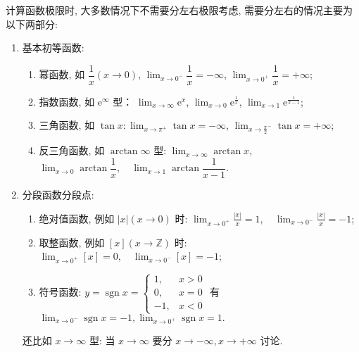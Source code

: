 计算函数极限时, 大多数情况下不需要分左右极限考虑, 需要分左右的情况主要为以下两部分:
\begin{enumerate}[label=(\arabic{*})]
    \item 基本初等函数:
    \begin{enumerate}
        \item 幂函数, 如 $ \dfrac{1}{x}(x \to 0) $, $\displaystyle  \lim _{x \to 0^{-}} \dfrac{1}{x}=-\infty$,  $\displaystyle  \lim _{x \to 0^{+}} \dfrac{1}{x}=+\infty$;
        \item 指数函数, 如 $ \mathrm{e}^{\infty} $ 型： $\displaystyle  \lim _{x \to \infty} \mathrm{e}^{x} $, $\displaystyle  \lim _{x \to 0} \mathrm{e}^{\frac{1}{x}}  $, $\displaystyle   \lim _{x \to 1} \mathrm{e}^{\frac{1}{x-1}} $;
        \item 三角函数, 如 $\displaystyle  \tan x: \lim _{x \to \pi^{+}} \tan x=-\infty  $, $\displaystyle   \lim _{x \to \frac{\pi}{2}^{-}} \tan x=+\infty  $;
        \item 反三角函数, 如 $\arctan  \infty $ 型: $\displaystyle  \lim _{x \to \infty} \arctan x  $, $\displaystyle   \lim _{x \to 0} \arctan \dfrac{1}{x}, \quad \lim _{x \to 1} \arctan \dfrac{1}{x-1} $.
    \end{enumerate}
    \item 分段函数分段点:
    \begin{enumerate}
        \item 绝对值函数, 例如 $ |x|(x \to 0)$ 时: $\displaystyle \lim _{x \to 0^{+}} \frac{|x|}{x}=1, \quad \lim _{x \to 0^{-}} \frac{|x|}{x}=-1$;
        \item 取整函数, 例如 $ [x](x \to \mathbb{Z})$ 时: $\displaystyle \lim _{x \to 0^{+}}[x]=0, \quad \lim _{x \to 0^{-}}[x]=-1$;
        \item 符号函数: $\displaystyle  y=\operatorname{sgn} x=\begin{cases}1, &x>0 \\ 0, &x=0 \\ -1, &x<0\end{cases}$ 有 $\displaystyle  \lim _{x \to 0^{-}} \operatorname{sgn} x=-1, \lim _{x \to 0^{+}} \operatorname{sgn} x=1 .$
    \end{enumerate}
    还比如 $ x \to \infty $ 型: 当 $ x \to \infty $ 要分 $ x \to-\infty, x \to+\infty $ 讨论.
\end{enumerate}

